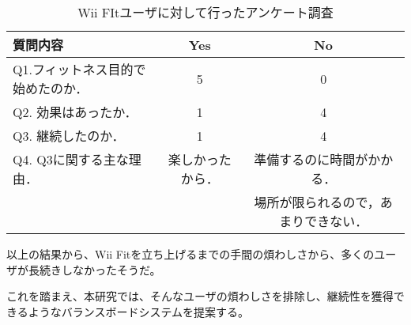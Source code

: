 \begin{table}[htbp]
\caption{Wii FItユーザに対して行ったアンケート調査}
\label{tb:sample01}
\begin{center}
\begin{tabular}{l|c|c}
\hline
質問内容&Yes&No\\\hline\hline
Q1.フィットネス目的で始めたのか．&5&0\\\hline
Q2. 効果はあったか．&1&4\\\hline
Q3. 継続したのか．&1&4\\\hline
Q4. Q3に関する主な理由．&楽しかったから．&準備するのに時間がかかる．\\\hline
 & &場所が限られるので，あまりできない．\\\hline
\end{tabular}\end{center}
\end{table}



以上の結果から、Wii Fitを立ち上げるまでの手間の煩わしさから、多くのユーザが長続きしなかったそうだ。

これを踏まえ、本研究では、そんなユーザの煩わしさを排除し、継続性を獲得できるようなバランスボードシステムを提案する。　　




